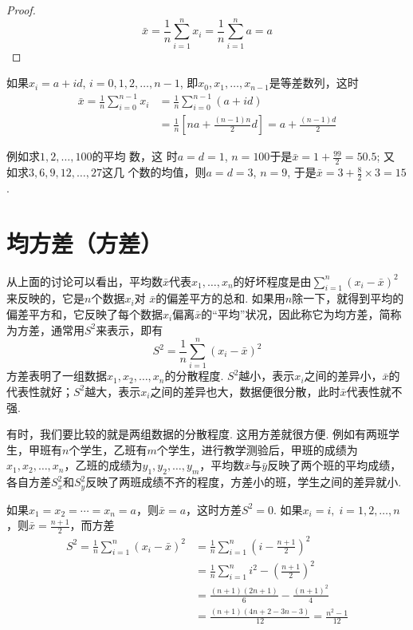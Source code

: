 \begin{proof}
    $$\bar{x}= \frac{1}{n}\sum_{i=1}^{n}x_{i}= \frac{1}{n}\sum_{i= 1}^{n}a= a$$
\end{proof}

\begin{example}
    如果$x_i=a+id$, $i=0,1,2,\ldots,n-1$,
即$x_0,x_1,\ldots,x_{n-1}$是等差数列，这时
\[\begin{split}
   \bar{x}= \frac {1}{n}\sum _{i= 0}^{n-1}x_{i}&= \frac{1}{n}\sum_{i= 0}^{n- 1}( a+ id) \\
   &= \frac{1}{n}\left [ na+ \frac {(  n- 1 )n}{2}d \right ]=  a+\frac{(n-1)d}{2}
\end{split}\]
\end{example}
例如求$1,2,\ldots, 100$的平均 数，这 时$a=d=1$, $n=100$于是$\bar{x} = 1+ \frac {99}{2}= 50.5$; 又 如求$3, 6, 9, 12, \ldots, 27 $这几 个数的均值，则$a= d= 3$, $n= 9$, 于是$\bar{x}=3+\frac{8}{2}\times 3=15$.


\section*{均方差（方差）}

从上面的讨论可以看出，平均数$\bar x$代表$x_1,\ldots,x_n$的好坏程度是由$\sum\limits^n_{i=1}(x_i-\bar x)^2$来反映的，它是$n$个数据$x_i$对
$\bar x$的偏差平方的总和. 如果用$n$除一下，就得到平均的偏差平方和，它反映了每个数据$x_i$偏离$\bar x$的“平均”状况，因此称它为均方差，简称为方差，通常用$S^2$来表示，即有
\[S^2=\frac{1}{n}\sum^n_{i=1}(x_i-\bar x)^2\]
方差表明了一组数据$x_1,x_2,\ldots,x_n$的分散程度. $S^2$越小，表示$x_i$之间的差异小，$\bar x$的代表性就好；$S^2$越大，表示$x_i$之间的差异也大，数据便很分散，此时$\bar x$代表性就不强.

有时，我们要比较的就是两组数据的分散程度. 这用方差就很方便. 例如有两班学生，甲班有$n$个学生，乙班有$m$个学生，进行教学测验后，甲班的成绩为$x_1,x_2,\ldots,x_n$，乙班的成绩为$y_1,y_2,\ldots,y_m$，平均数$\bar x$与$\bar y$反映了两个班的平均成绩，各自方差$S^2_x$和$S^2_y$反映了两班成绩不齐的程度，方差小的班，学生之间的差异就小.

如果$x_1=x_2=\cdots=x_n=a$，则$\bar x=a$，这时方差$S^2=0$. 如果$x_i=i,\; i=1,2,\ldots,n$，则$\bar x=\frac{n+1}{2}$，而方差
\[\begin{split}
    S^2=\frac{1}{n}\sum^n_{i=1}(x_i-\bar x)^2 &=\frac{1}{n}\sum^n_{i=1}\left(i-\frac{n+1}{2}\right)^2\\
&=\frac{1}{n}\sum^n_{i=1}i^2-\left(\frac{n+1}{2}\right)^2\\
&=\frac{(n+1)(2n+1)}{6}-\frac{(n+1)^2}{4}\\
&=\frac{(n+1)(4n+2-3n-3)}{12}=\frac{n^2-1}{12}
\end{split}\]

